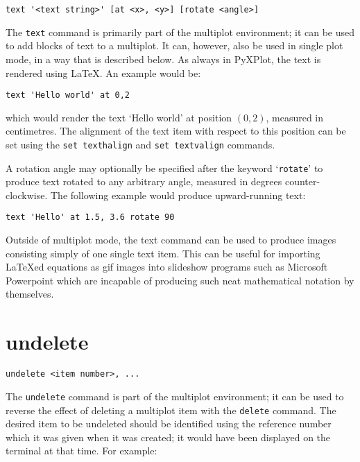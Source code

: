 \documentclass[a4paper,onecolumn,11pt]{book}
\begin{document}
\begin{verbatim}
text '<text string>' [at <x>, <y>] [rotate <angle>]
\end{verbatim}

The {\tt text} command is primarily part of the multiplot environment; it can be
used to add blocks of text to a multiplot. It can, however, also be used in
single plot mode, in a way that is described below. As always in PyXPlot, the
text is rendered using \LaTeX. An example would be:

\begin{verbatim}
text 'Hello world' at 0,2
\end{verbatim}

\noindent which would render the text `Hello world' at position $(0,2)$,
measured in centimetres. The alignment of the text item with respect to this
position can be set using the {\tt set texthalign} and {\tt set textvalign}
commands.

A rotation angle may optionally be specified after the keyword `{\tt rotate}'
to produce text rotated to any arbitrary angle, measured in degrees
counter-clockwise. The following example would produce upward-running text:

\begin{verbatim}
text 'Hello' at 1.5, 3.6 rotate 90
\end{verbatim}

Outside of multiplot mode, the text command can be used to produce images
consisting simply of one single text item. This can be useful for importing
\LaTeX ed equations as gif images into slideshow programs such as Microsoft
Powerpoint which are incapable of producing such neat mathematical notation
by themselves.

\section{undelete}

\begin{verbatim}
undelete <item number>, ...
\end{verbatim}

The {\tt undelete} command is part of the multiplot environment; it can be used
to reverse the effect of deleting a multiplot item with the {\tt delete}
command. The desired item to be undeleted should be identified using the
reference number which it was given when it was created; it would have been
displayed on the terminal at that time. For example:
\end{document}
